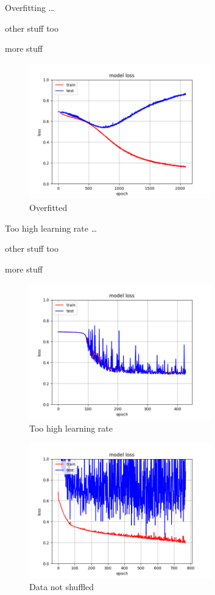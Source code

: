 Overfitting \dots

other stuff too

more stuff

\begin{figure}[H] %
\center
\includegraphics[width=0.7\textwidth]{pictures/overfit.png}
\caption{\label{fig:overfit}Overfitted}
\end{figure}

Too high learning rate \dots

other stuff too

more stuff

\begin{figure}[H]
\center
\includegraphics[width=0.7\textwidth]{pictures/high_lr.png}
\caption{\label{fig:high_lr}Too high learning rate}
\end{figure}



\begin{figure}[H]
\center
\includegraphics[width=0.7\textwidth]{pictures/no_shuffle.png}
\caption{\label{fig:no_shuffle}Data not shuffled}
\end{figure}

